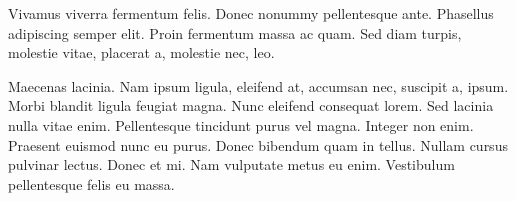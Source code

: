 Vivamus viverra fermentum felis. Donec nonummy pellentesque ante. Phasellus adipiscing semper elit. Proin fermentum massa ac quam. Sed diam turpis, molestie vitae, placerat a, molestie nec, leo.

\begin{table}[htbp]
 \caption{Combination Nomenclature, (Average Fill Factor)}
\label{table:AverageFillFactor}
\end{table}

Maecenas lacinia. Nam ipsum ligula, eleifend at, accumsan nec, suscipit a, ipsum. Morbi blandit ligula feugiat magna. Nunc eleifend consequat lorem. Sed lacinia nulla vitae enim. Pellentesque tincidunt purus vel magna. Integer non enim. Praesent euismod nunc eu purus. Donec bibendum quam in tellus. Nullam cursus pulvinar lectus. Donec et mi. Nam vulputate metus eu enim. Vestibulum pellentesque
felis eu massa.

